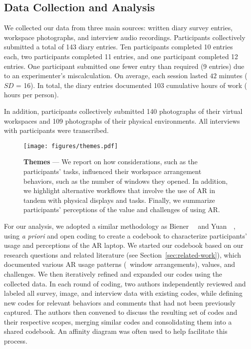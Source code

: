\subsection{Data Collection and Analysis}
\label{sec:analysis}
We collected our data from three main sources:
written diary survey entries,
workspace photographs, 
and interview audio recordings.
Participants collectively submitted a total of 143 diary entries. 
Ten participants completed 10 entries each, two participants completed 11 entries, and one participant completed 12 entries. 
One participant submitted one fewer entry than required (9 entries) due to an experimenter's miscalculation.
On average, each session lasted $42$ minutes ($SD$ = 16). 
In total, the diary entries documented 103 cumulative hours of work ( hours per person). 

In addition, participants collectively submitted 140 photographs of their virtual workspaces and 109 photographs of their physical environments. 
All interviews with participants were transcribed.

\begin{figure*}
    \centering
    \texttt{[image: figures/themes.pdf]}
    \caption{\textbf{Themes} --- We report on how considerations, such as the participants' tasks, influenced their workspace arrangement behaviors, such as the number of windows they opened. In addition, we highlight alternative workflows that involve the use of AR in tandem with physical displays and tasks. Finally, we summarize participants' perceptions of the value and challenges of using AR.}
    \label{fig:themes}
\end{figure*}

For our analysis, we adopted a similar methodology as Biener~\etal~\cite{biener2024holdtight} and Yuan~\etal~\cite{yuan2022multideviceusage}, using \emph{a priori} and open coding to create a codebook to characterize participants' usage and perceptions of the AR laptop.
We started our codebook based on our research questions and related literature (see Section~\ref{sec:related-work}), which documented various AR usage patterns (\eg~window arrangements), values, and challenges.
We then iteratively refined and expanded our codes using the collected data.
In each round of coding, 
two authors independently reviewed and labeled all survey, image, and interview data with existing codes, while defining new codes for relevant behaviors and comments that had not been previously captured.
The authors then convened to discuss the resulting set of codes and their respective scopes, merging similar codes and consolidating them into a shared codebook.
An affinity diagram was often used to help facilitate this process.

